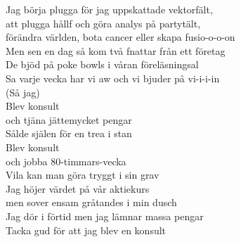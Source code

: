 \documentclass[a6paper, 10pt, twoside]{article}
\begin{document}
\begin{center}
\end{center}
\begin{lyrics}
Jag börja plugga för jag uppskattade vektorfält,\\
att plugga hållf och göra analys på partytält,\\
förändra världen, bota cancer eller skapa fusio-o-o-on
\vspace{5pt}\\
Men sen en dag så kom två fnattar från ett företag\\
De bjöd på poke bowls i våran föreläsningsal\\
Sa varje vecka har vi aw och vi bjuder på vi-i-i-in
\vspace{5pt}\\
(Så jag)
\vspace{5pt}\\
Blev konsult\\
och tjäna jättemycket pengar\\
Sålde själen för en trea i stan\\
Blev konsult\\
och jobba 80-timmars-vecka\\
Vila kan man göra tryggt i sin grav
\vspace{5pt}\\
Jag höjer värdet på vår aktiekurs\\
men sover ensam gråtandes i min dusch\\
Jag dör i förtid men jag lämnar massa pengar\\
Tacka gud för att jag blev en konsult
\end{lyrics}
\end{document}
